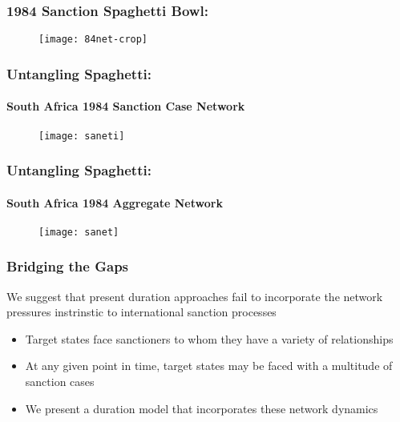 \begin{frame}
\frametitle{1984 Sanction Spaghetti Bowl:}
\vspace{-0.5cm}

\begin{figure}[ht]
  \centering
  \texttt{[image: 84net-crop]}
\end{figure}

\end{frame}

\begin{frame}
\frametitle{Untangling Spaghetti:}
\framesubtitle{South Africa 1984 Sanction Case Network}

\vspace{-.4cm}
\begin{figure}[ht]
	\centering
	\texttt{[image: saneti]}
\end{figure}

\end{frame}

\begin{frame}
\frametitle{Untangling Spaghetti:}
\framesubtitle{South Africa 1984 Aggregate Network}

\begin{figure}[ht]
	\centering
	\texttt{[image: sanet]}
\end{figure}

\end{frame}

\begin{frame}
\frametitle{Bridging the Gaps}
We suggest that present duration approaches fail to incorporate the network pressures instrinstic to international sanction processes

\begin{itemize}
	\item Target states face sanctioners to whom they have a variety of relationships
	\item At any given point in time, target states may be faced with a multitude of sanction cases
	\item We present a duration model that incorporates these network dynamics
\end{itemize}

\end{frame}

